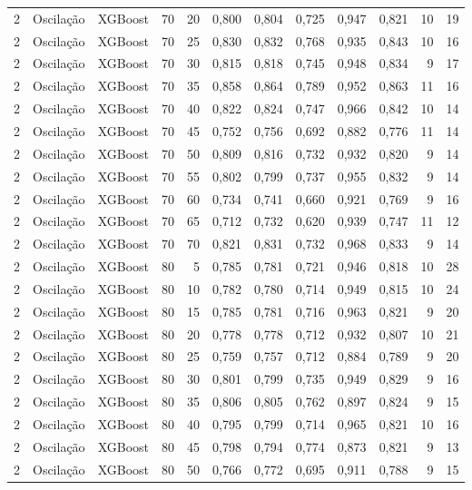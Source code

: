 \begin{longtable}{@{}rllrrrrrrrrr@{}}
2 & Oscilação & XGBoost & 70 & 20 & 0,800 & 0,804 & 0,725 & 0,947 & 0,821 & 10 & 19 \\
2 & Oscilação & XGBoost & 70 & 25 & 0,830 & 0,832 & 0,768 & 0,935 & 0,843 & 10 & 16 \\
2 & Oscilação & XGBoost & 70 & 30 & 0,815 & 0,818 & 0,745 & 0,948 & 0,834 & 9 & 17 \\
2 & Oscilação & XGBoost & 70 & 35 & 0,858 & 0,864 & 0,789 & 0,952 & 0,863 & 11 & 16 \\
2 & Oscilação & XGBoost & 70 & 40 & 0,822 & 0,824 & 0,747 & 0,966 & 0,842 & 10 & 14 \\
2 & Oscilação & XGBoost & 70 & 45 & 0,752 & 0,756 & 0,692 & 0,882 & 0,776 & 11 & 14 \\
2 & Oscilação & XGBoost & 70 & 50 & 0,809 & 0,816 & 0,732 & 0,932 & 0,820 & 9 & 14 \\
2 & Oscilação & XGBoost & 70 & 55 & 0,802 & 0,799 & 0,737 & 0,955 & 0,832 & 9 & 14 \\
2 & Oscilação & XGBoost & 70 & 60 & 0,734 & 0,741 & 0,660 & 0,921 & 0,769 & 9 & 16 \\
2 & Oscilação & XGBoost & 70 & 65 & 0,712 & 0,732 & 0,620 & 0,939 & 0,747 & 11 & 12 \\
2 & Oscilação & XGBoost & 70 & 70 & 0,821 & 0,831 & 0,732 & 0,968 & 0,833 & 9 & 14 \\
2 & Oscilação & XGBoost & 80 & 5 & 0,785 & 0,781 & 0,721 & 0,946 & 0,818 & 10 & 28 \\
2 & Oscilação & XGBoost & 80 & 10 & 0,782 & 0,780 & 0,714 & 0,949 & 0,815 & 10 & 24 \\
2 & Oscilação & XGBoost & 80 & 15 & 0,785 & 0,781 & 0,716 & 0,963 & 0,821 & 9 & 20 \\
2 & Oscilação & XGBoost & 80 & 20 & 0,778 & 0,778 & 0,712 & 0,932 & 0,807 & 10 & 21 \\
2 & Oscilação & XGBoost & 80 & 25 & 0,759 & 0,757 & 0,712 & 0,884 & 0,789 & 9 & 20 \\
2 & Oscilação & XGBoost & 80 & 30 & 0,801 & 0,799 & 0,735 & 0,949 & 0,829 & 9 & 16 \\
2 & Oscilação & XGBoost & 80 & 35 & 0,806 & 0,805 & 0,762 & 0,897 & 0,824 & 9 & 15 \\
2 & Oscilação & XGBoost & 80 & 40 & 0,795 & 0,799 & 0,714 & 0,965 & 0,821 & 10 & 16 \\
2 & Oscilação & XGBoost & 80 & 45 & 0,798 & 0,794 & 0,774 & 0,873 & 0,821 & 9 & 13 \\
2 & Oscilação & XGBoost & 80 & 50 & 0,766 & 0,772 & 0,695 & 0,911 & 0,788 & 9 & 15 \\

\end{longtable}
